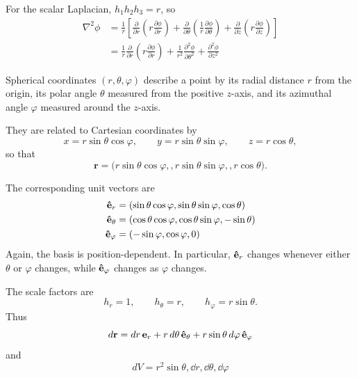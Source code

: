 			For the scalar Laplacian, $h_1h_2h_3=r$, so
			\begin{align*}
				\nabla^2\phi
				&=
				\frac{1}{r}
				\left[
				\frac{\partial}{\partial r}
				\left(r\frac{\partial\phi}{\partial r}\right)
				+
				\frac{\partial}{\partial\theta}
				\left(
				\frac{1}{r}\frac{\partial\phi}{\partial\theta}
				\right)
				+
				\frac{\partial}{\partial z}
				\left(
				r\frac{\partial\phi}{\partial z}
				\right)
				\right]\\[4pt]
				&=
				\frac{1}{r}
				\frac{\partial}{\partial r}
				\left(
				r\frac{\partial\phi}{\partial r}
				\right)
				+
				\frac{1}{r^2}
				\frac{\partial^2\phi}{\partial\theta^2}
				+
				\frac{\partial^2\phi}{\partial z^2}
			\end{align*}


			Spherical coordinates $(r,\theta,\varphi)$ describe a point by its radial distance $r$ from the origin, its polar angle $\theta$ measured from the positive $z$-axis, and its azimuthal angle $\varphi$ measured around the $z$-axis.

			They are related to Cartesian coordinates by
			\[
				x=r\sin\theta\cos\varphi,
				\qquad
				y=r\sin\theta\sin\varphi,
				\qquad
				z=r\cos\theta,
				\]
				so that
				\[
				\mathbf r
				=
				\big(
				r\sin\theta\cos\varphi,,
				r\sin\theta\sin\varphi,,
				r\cos\theta
				\big).
			\]

			The corresponding unit vectors are
			\begin{align*}
				\vu{e}_r
				&=
				(\sin\theta\cos\varphi,
				\sin\theta\sin\varphi,
				\cos\theta)\\
			    \vu{e}_\theta
				&=
				(\cos\theta\cos\varphi,
				\cos\theta\sin\varphi,
				-\sin\theta)\\
				\vu{e}_\varphi
				&=
				(-\sin\varphi,
				\cos\varphi,
				0)
			\end{align*}
			Again, the basis is position-dependent. In particular, $\vu{e}_r$ changes whenever either $\theta$ or $\varphi$ changes, while $\vu{e}_\varphi$ changes as $\varphi$ changes.

			The scale factors are
			\[
				h_r=1,
				\qquad
				h_\theta=r,
				\qquad
				h_\varphi=r\sin\theta.
			\]
			Thus
			\[
				\dd{\vb{r}}
				=
				\dd{r}\vb{e}_r
				+
				r\dd{\theta}\vu{e}_\theta
				+
				r\sin\theta\dd{\varphi}\vu{e}_\varphi
			\]
			and
			\[
				dV
				=
				r^2\sin\theta,
				\dd{r},\dd{\theta},\dd{\varphi}
			\]

